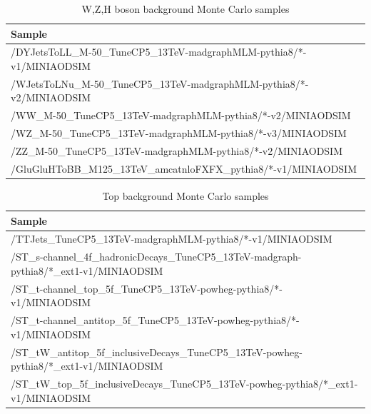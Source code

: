 \begin{table}[htb]
  \caption{W,Z,H boson background Monte Carlo samples}
  \begin{center}
    \footnotesize
    \begin{tabular}{l}\hline
      Sample \\
      \hline
      /DYJetsToLL\_M-50\_TuneCP5\_13TeV-madgraphMLM-pythia8/*-v1/MINIAODSIM \\
      \hline
      /WJetsToLNu\_M-50\_TuneCP5\_13TeV-madgraphMLM-pythia8/*-v2/MINIAODSIM \\
      \hline
      /WW\_M-50\_TuneCP5\_13TeV-madgraphMLM-pythia8/*-v2/MINIAODSIM \\
      /WZ\_M-50\_TuneCP5\_13TeV-madgraphMLM-pythia8/*-v3/MINIAODSIM \\
      /ZZ\_M-50\_TuneCP5\_13TeV-madgraphMLM-pythia8/*-v2/MINIAODSIM \\
      \hline
      /GluGluHToBB\_M125\_13TeV\_amcatnloFXFX\_pythia8/*-v1/MINIAODSIM \\
      \hline
    \end{tabular}
    \label{tab:wzsample}
  \end{center}
\end{table}


\begin{table}[htb]
  \caption{Top background Monte Carlo samples}
  \begin{center}
    \footnotesize
    \begin{tabular}{l}\hline
      Sample \\
      \hline
      /TTJets\_TuneCP5\_13TeV-madgraphMLM-pythia8/*-v1/MINIAODSIM \\
      \hline
      /ST\_s-channel\_4f\_hadronicDecays\_TuneCP5\_13TeV-madgraph-pythia8/*\_ext1-v1/MINIAODSIM \\
      /ST\_t-channel\_top\_5f\_TuneCP5\_13TeV-powheg-pythia8/*-v1/MINIAODSIM \\
      /ST\_t-channel\_antitop\_5f\_TuneCP5\_13TeV-powheg-pythia8/*-v1/MINIAODSIM \\
      /ST\_tW\_antitop\_5f\_inclusiveDecays\_TuneCP5\_13TeV-powheg-pythia8/*\_ext1-v1/MINIAODSIM \\
      /ST\_tW\_top\_5f\_inclusiveDecays\_TuneCP5\_13TeV-powheg-pythia8/*\_ext1-v1/MINIAODSIM \\
      \hline
    \end{tabular}
    \label{tab:topsample}
  \end{center}
\end{table}


